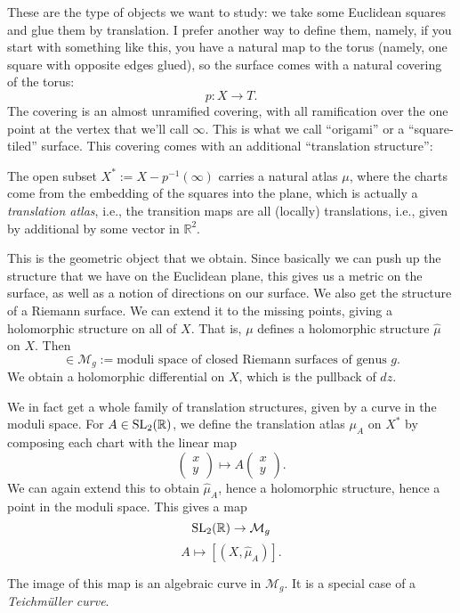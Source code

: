 \documentclass[reqno]{amsart} 
\numberwithin{theorem}{section}
\numberwithin{equation}{section}
\begin{document}
These are the type of objects we want to study: we take some Euclidean squares and glue them by translation.  I prefer another way to define them, namely, if you start with something like this, you have a natural map to the torus (namely, one square with opposite edges glued), so the surface comes with a natural covering of the torus:
\begin{equation*}
  p : X \rightarrow T.
\end{equation*}
The covering is an almost unramified covering, with all ramification over the one point at the vertex that we'll call $\infty$.  This is what we call ``origami'' or a ``square-tiled'' surface.  This covering comes with an additional ``translation structure'':

\begin{remark}
  The open subset $X^\ast := X - p^{-1}(\infty)$ carries a natural atlas $\mu$, where the charts come from the embedding of the squares into the plane, which is actually a \emph{translation atlas}, i.e., the transition maps are all (locally) translations, i.e., given by additional by some vector in $\mathbb{R}^2$.
\end{remark}

This is the geometric object that we obtain.  Since basically we can push up the structure that we have on the Euclidean plane, this gives us a metric on the surface, as well as a notion of directions on our surface.  We also get the structure of a Riemann surface.  We can extend it to the missing points, giving a holomorphic structure on all of $X$.  That is, $\mu$ defines a holomorphic structure $\hat{\mu}$ on $X$.  Then
\begin{equation*}
  [(X, \mu)] \in \mathcal{M}_g := \text{moduli space of closed Riemann surfaces of genus $g$}.
\end{equation*}
We obtain a holomorphic differential on $X$, which is the pullback of $d z$.

We in fact get a whole family of translation structures, given by a curve in the moduli space.  For $A \in \operatorname{SL}_2(\mathbb{R})$, we define the translation atlas $\mu_A$ on $X^\ast$ by composing each chart with the linear map
\begin{equation*}
  \begin{pmatrix}
    x    \\
    y
  \end{pmatrix}
  \mapsto A
  \begin{pmatrix}
    x    \\
    y
  \end{pmatrix}.
\end{equation*}
We can again extend this to obtain $\hat{\mu}_A$, hence a holomorphic structure, hence a point in the moduli space.  This gives a map
\begin{equation*}
  \operatorname{SL}_2(\mathbb{R}) \rightarrow \mathcal{M}_g
\end{equation*}
\begin{equation*}
  A \mapsto[(X, \hat{\mu}_A)].
\end{equation*}
\begin{fact}
  The image of this map is an algebraic curve in $\mathcal{M}_g$.  It is a special case of a \emph{Teichm\"uller curve}.  
\end{fact}
\end{document}
